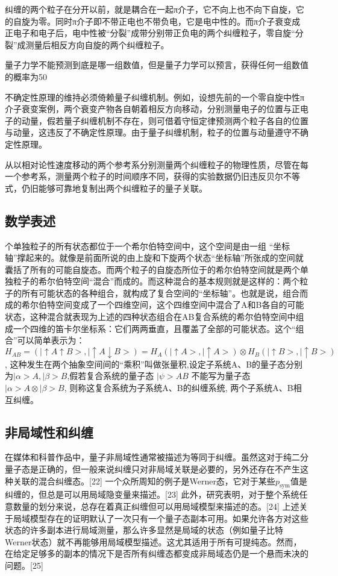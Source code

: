        纠缠的两个粒子在分开以前，就是耦合在一起π介子，它不向上也不向下自旋，它的自旋为零。同时π介子即不带正电也不带负电，它是电中性的。而π介子衰变成正电子和电子后，电中性被“分裂”成带分别带正负电的两个纠缠粒子，零自旋“分裂”成测量后相反方向自旋的两个纠缠粒子。

       量子力学不能预测到底是哪一组数值，但是量子力学可以预言，获得任何一组数值的概率为50%

       不确定性原理的维持必须倚赖量子纠缠机制。例如，设想先前的一个零自旋中性π介子衰变案例，两个衰变产物各自朝着相反方向移动，分别测量电子的位置与正电子的动量，假若量子纠缠机制不存在，则可借着守恒定律预测两个粒子各自的位置与动量，这违反了不确定性原理。由于量子纠缠机制，粒子的位置与动量遵守不确定性原理。

从以相对论性速度移动的两个参考系分别测量两个纠缠粒子的物理性质，尽管在每一个参考系，测量两个粒子的时间顺序不同，获得的实验数据仍旧违反贝尔不等式，仍旧能够可靠地复制出两个纠缠粒子的量子关联。

\subsection{数学表述}
个单独粒子的所有状态都位于一个希尔伯特空间中，这个空间是由一组 “坐标轴”撑起来的。就像是前面所说的由上旋和下旋两个状态“坐标轴”所张成的空间就囊括了所有的可能自旋态。而两个粒子的自旋态所位于的希尔伯特空间就是两个单独粒子的希尔伯特空间“混合”而成的。而这种混合的基本规则就是这样的：两个粒子的所有可能状态的各种组合，就构成了复合空间的“坐标轴”。也就是说，组合而成的希尔伯特空间变成了一个四维空间，这个四维空间中混合了A和B各自的可能状态，这种混合就表现为上述的四种状态组合在AB复合系统的希尔伯特空间中组成一个四维的笛卡尔坐标系：它们两两垂直，且覆盖了全部的可能状态。这个“组合”可以简单表示为：
$$H_{AB} = (|\uparrow A \uparrow B >, |\uparrow A \downarrow B >) = H_A (|\uparrow A >,|\uparrow A >) \otimes H_B (|\uparrow B >, |\uparrow B >)~$$,
这种发生在两个抽象空间间的“乘积”叫做张量积,设定子系统A、B的量子态分别为$|\alpha > A, |\beta > B$,假若复合系统的量子态 $|\psi > AB$ 不能写为量子态 $|\alpha > A \otimes |\beta >B$, 则称这复合系统为子系统A、B的纠缠系统, 两个子系统A、B相互纠缠。

\subsection{非局域性和纠缠}
在媒体和科普作品中，量子非局域性通常被描述为等同于纠缠。虽然这对于纯二分量子态是正确的，但一般来说纠缠只对非局域关联是必要的，另外还存在不产生这种关联的混合纠缠态。[22] 一个众所周知的例子是Werner态，它对于某些$p_{\text{sym}}$值是纠缠的，但总是可以用局域隐变量来描述。[23] 此外，研究表明，对于整个系统任意数量的划分来说，总存在着真正纠缠但可以用局域模型来描述的态。[24] 上述关于局域模型存在的证明默认了一次只有一个量子态副本可用。如果允许各方对这些状态的许多副本进行局域测量，那么许多显然是局域的状态（例如量子比特Werner状态）就不再能够用局域模型描述。这尤其适用于所有可提纯态。然而，在给定足够多的副本的情况下是否所有纠缠态都变成非局域态仍是一个悬而未决的问题。[25]

